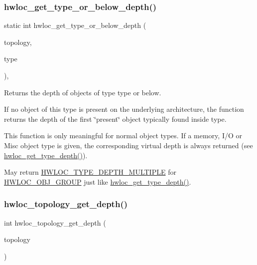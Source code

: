 \subsubsection{\texorpdfstring{hwloc\+\_\+get\+\_\+type\+\_\+or\+\_\+below\+\_\+depth()}{hwloc\_get\_type\_or\_below\_depth()}}
{\footnotesize\ttfamily static int hwloc\+\_\+get\+\_\+type\+\_\+or\+\_\+below\+\_\+depth (\begin{DoxyParamCaption}\item[{\hyperlink{a00186_ga9d1e76ee15a7dee158b786c30b6a6e38}{hwloc\+\_\+topology\+\_\+t}}]{topology,  }\item[{\hyperlink{a00184_gacd37bb612667dc437d66bfb175a8dc55}{hwloc\+\_\+obj\+\_\+type\+\_\+t}}]{type }\end{DoxyParamCaption})\hspace{0.3cm}{\ttfamily [inline]}, {\ttfamily [static]}}



Returns the depth of objects of type {\ttfamily type} or below. 

If no object of this type is present on the underlying architecture, the function returns the depth of the first \char`\"{}present\char`\"{} object typically found inside {\ttfamily type}.

This function is only meaningful for normal object types. If a memory, I/O or Misc object type is given, the corresponding virtual depth is always returned (see \hyperlink{a00187_ga8bec782e21be313750da70cf7428b374}{hwloc\+\_\+get\+\_\+type\+\_\+depth()}).

May return \hyperlink{a00187_ggaf4e663cf42bbe20756b849c6293ef575ae99465995cacde6c210d5fc2e409798c}{H\+W\+L\+O\+C\+\_\+\+T\+Y\+P\+E\+\_\+\+D\+E\+P\+T\+H\+\_\+\+M\+U\+L\+T\+I\+P\+LE} for \hyperlink{a00184_ggacd37bb612667dc437d66bfb175a8dc55a5269ef95be72f88465559d35c9b7ad56}{H\+W\+L\+O\+C\+\_\+\+O\+B\+J\+\_\+\+G\+R\+O\+UP} just like \hyperlink{a00187_ga8bec782e21be313750da70cf7428b374}{hwloc\+\_\+get\+\_\+type\+\_\+depth()}. \mbox{\label{a00187_gae54d1782ca9b54bea915f5c18a9158fa}} 
\subsubsection{\texorpdfstring{hwloc\+\_\+topology\+\_\+get\+\_\+depth()}{hwloc\_topology\_get\_depth()}}
{\footnotesize\ttfamily int hwloc\+\_\+topology\+\_\+get\+\_\+depth (\begin{DoxyParamCaption}\item[{\hyperlink{a00186_ga9d1e76ee15a7dee158b786c30b6a6e38}{hwloc\+\_\+topology\+\_\+t} restrict}]{topology }\end{DoxyParamCaption})}



